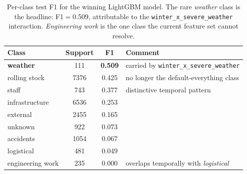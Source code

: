 \begin{table}[H]
    \centering
    \caption{Per-class test F1 for the winning LightGBM model. The rare \emph{weather} class is the headline: F1$=$\num{0.509}, attributable to the \texttt{winter\_x\_severe\_weather} interaction. \emph{Engineering work} is the one class the current feature set cannot resolve.}
    \label{tab:cause-perclass}
    \small
    \begin{tabular}{l S[table-format=4.0,group-separator={,}] S[table-format=1.3] l}
        \toprule
        Class & {Support} & {F1} & Comment \\
        \midrule
        \textbf{weather}    &  111 & {\bfseries 0.509} & carried by \texttt{winter\_x\_severe\_weather} \\
        rolling stock       & 7376 & 0.425 & no longer the default-everything class \\
        staff               &  743 & 0.377 & distinctive temporal pattern \\
        infrastructure      & 6536 & 0.253 &  \\
        external            & 2455 & 0.165 &  \\
        unknown             &  922 & 0.073 &  \\
        accidents           & 1054 & 0.067 &  \\
        logistical          &  481 & 0.049 &  \\
        engineering work    &  235 & 0.000 & overlaps temporally with \emph{logistical} \\
        \bottomrule
    \end{tabular}
\end{table}
